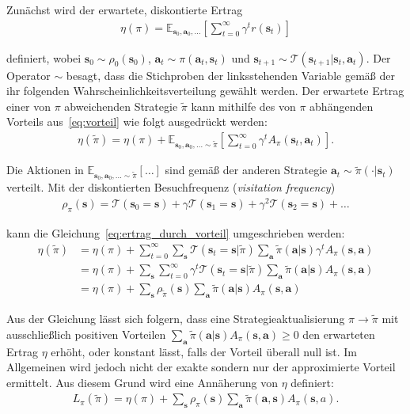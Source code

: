 Zunächst wird der erwartete, diskontierte Ertrag
\begin{align*} 
\eta(\pi) = \mathds{E}_{\bm{s}_0, \bm{a}_0, \dots} 
\left[ \sum\limits_{t=0}^{\infty} \gamma^t r(\bm{s}_t)\right]
\end{align*}

definiert, wobei 
$\bm{s}_0 \sim \rho_0(\bm{s}_0)$, 
$\bm{a}_t \sim \pi(\bm{a}_t,\bm{s}_t)$ und 
$\bm{s}_{t+1} \sim  \mathcal{T}(\bm{s}_{t+1}|\bm{s}_t, \bm{a}_t)$. Der Operator $\sim$ besagt, dass die Stichproben der linksstehenden Variable gemäß der ihr folgenden Wahrscheinlichkeitsverteilung gewählt werden. Der erwartete Ertrag einer von $\pi$ abweichenden Strategie $\tilde{\pi}$ kann mithilfe des von $\pi$ abhängenden Vorteils aus~\eqref{eq:vorteil} wie folgt ausgedrückt werden:
\begin{align}
\eta(\tilde{\pi}) = \eta(\pi) + \mathds{E}_{\bm{s}_0, \bm{a}_0, \dots \sim \tilde{\pi}}
\left[ \sum\limits_{t=0}^{\infty} \gamma^t A_\pi (\bm{s}_t, \bm{a}_t) \right].
\label{eq:ertrag_durch_vorteil}
\end{align}

Die Aktionen in $\mathds{E}_{\bm{s}_0, \bm{a}_0, \dots \sim \tilde{\pi}} \left[ \dots \right]$ sind gemäß der anderen Strategie $\bm{a}_t \sim \tilde{\pi}(\cdot|\bm{s}_t)$ verteilt. Mit der diskontierten Besuchfrequenz (\textit{visitation frequency})
\begin{align*}
\rho_\pi(\bm{s}) = \mathcal{T}(\bm{s}_0=\bm{s})+\gamma\mathcal{T}(\bm{s}_1=\bm{s})+
\gamma^2\mathcal{T}(\bm{s}_2=\bm{s})+ \dots
\end{align*}

kann die Gleichung~\eqref{eq:ertrag_durch_vorteil} umgeschrieben werden:
\begin{align}
\eta(\tilde{\pi}) &= \eta(\pi) 
+\sum\limits_{t=0}^{\infty} \sum\limits_{\bm{s}} \mathcal{T}(\bm{s}_t=\bm{s}|\tilde{\pi})
\sum\limits_{\bm{a}}\tilde{\pi}(\bm{a}|\bm{s})\gamma^t A_\pi(\bm{s},\bm{a}) \nonumber \\
&= \eta(\pi) 
+\sum\limits_{\bm{s}} \sum\limits_{t=0}^{\infty} \gamma^t \mathcal{T}(\bm{s}_t=\bm{s}|\tilde{\pi})
\sum\limits_{\bm{a}}\tilde{\pi}(\bm{a}|\bm{s}) A_\pi(\bm{s},\bm{a}) \nonumber \\
&= \eta(\pi) 
+\sum\limits_{\bm{s}} \rho_{\tilde{\pi}} (\bm{s})
\sum\limits_{\bm{a}}\tilde{\pi}(\bm{a}|\bm{s}) A_\pi(\bm{s},\bm{a}) 
\label{eq:}
\end{align}

Aus der Gleichung lässt sich folgern, dass eine Strategieaktualisierung 
$\pi \rightarrow \tilde{\pi}$
mit ausschließlich positiven Vorteilen 
$\sum\limits_{\bm{a}}\tilde{\pi}(\bm{a}|\bm{s}) A_\pi(\bm{s},\bm{a}) \geq 0$
den erwarteten Ertrag $\eta$ erhöht, oder konstant lässt, falls der Vorteil überall null ist. Im Allgemeinen wird jedoch nicht der exakte sondern nur der approximierte Vorteil ermittelt. Aus diesem Grund wird eine Annäherung von $\eta$ definiert:
\begin{align}
L_\pi(\tilde{\pi})= \eta(\pi) + \sum\limits_{\bm{s}}\rho_\pi(\bm{s})
\sum\limits_{\bm{a}} \tilde{\pi}(\bm{a},\bm{s})A_\pi(\bm{s},a).
\label{eq:approximation_eta}
\end{align}

